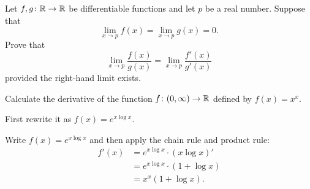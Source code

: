 \begin{problem}
	Let $f,g \colon \mathbb R \to \mathbb R$ be differentiable functions
	and let $p$ be a real number.
	Suppose that
	\[ \lim_{x \to p} f(x) = \lim_{x \to p} g(x) = 0. \]
	Prove that
	\[ \lim_{x \to p} \frac{f(x)}{g(x)}
		= \lim_{x \to p} \frac{f'(x)}{g'(x)} \]
	provided the right-hand limit exists.
\end{problem}

\begin{problem}
	Calculate the derivative of the function $f \colon (0,\infty) \to \mathbb R$
	defined by $f(x) = x^x$.
	\begin{hint}
		First rewrite it as $f(x) = e^{x \log x}$.
	\end{hint}
	\begin{sol}
		Write $f(x) = e^{x \log x}$ and then apply the chain rule and product rule:
		\begin{align*}
			f'(x) &= e^{x \log x} \cdot (x \log x)' \\
				&= e^{x \log x} \cdot \left( 1 + \log x \right) \\
				&= x^x \left( 1 + \log x \right).
		\end{align*}
	\end{sol}
\end{problem}
